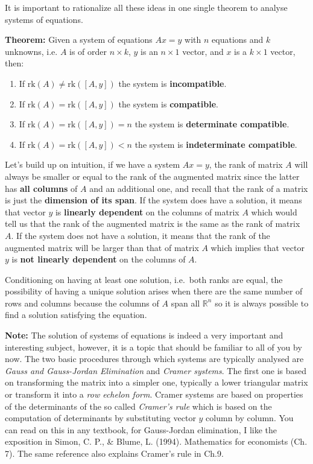 \documentclass[11pt]{article}
\providecommand{\tightlist}{%
      \setlength{\itemsep}{0pt}\setlength{\parskip}{0pt}}
\begin{document}
It is important to rationalize all these ideas in one single theorem to
analyse systems of equations.

\textbf{Theorem:} Given a system of equations \(Ax = y\) with \(n\)
equations and \(k\) unknowns, i.e. \(A\) is of order \(n\times k\),
\(y\) is an \(n\times 1\) vector, and \(x\) is a \(k\times 1\) vector,
then:

\begin{enumerate}
\def\labelenumi{\arabic{enumi}.}
\tightlist
\item
  If \(\text{rk}(A) \neq \text{rk}\left([A,y]\right)\) the system is
  \textbf{incompatible}.
\item
  If \(\text{rk}(A) = \text{rk}\left([A,y]\right)\) the system is
  \textbf{compatible}.
\item
  If \(\text{rk}(A) = \text{rk}\left([A,y]\right) = n\) the system is
  \textbf{determinate compatible}.
\item
  If \(\text{rk}(A) = \text{rk}\left([A,y]\right) < n\) the system is
  \textbf{indeterminate compatible}.
\end{enumerate}

Let's build up on intuition, if we have a system \(Ax = y\), the rank of
matrix \(A\) will always be smaller or equal to the rank of the
augmented matrix since the latter has \textbf{all columns} of \(A\) and
an additional one, and recall that the rank of a matrix is just the
\textbf{dimension of its span}. If the system does have a solution, it
means that vector \(y\) is \textbf{linearly dependent} on the columns of
matrix \(A\) which would tell us that the rank of the augmented matrix
is the same as the rank of matrix \(A\). If the system does not have a
solution, it means that the rank of the augmented matrix will be larger
than that of matrix \(A\) which implies that vector \(y\) is \textbf{not
linearly dependent} on the columns of \(A\).

Conditioning on having at least one solution, i.e.~both ranks are equal,
the possibility of having a unique solution arises when there are the
same number of rows and columns because the columns of \(A\) span all
\(\mathbb{R}^n\) so it is always possible to find a solution satisfying
the equation.

\textbf{Note:} The solution of systems of equations is indeed a very
important and interesting subject, however, it is a topic that should be
familiar to all of you by now. The two basic procedures through which
systems are typically analysed are \emph{Gauss and Gauss-Jordan
Elimination} and \emph{Cramer systems}. The first one is based on
transforming the matrix into a simpler one, typically a lower triangular
matrix or transform it into a \emph{row echelon form}. Cramer systems
are based on properties of the determinants of the so called
\emph{Cramer's rule} which is based on the computation of determinants
by substituting vector \(y\) column by column. You can read on this in
any textbook, for Gauss-Jordan elimination, I like the exposition in
Simon, C. P., \& Blume, L. (1994). Mathematics for economists (Ch. 7).
The same reference also explains Cramer's rule in Ch.9.
\end{document}
